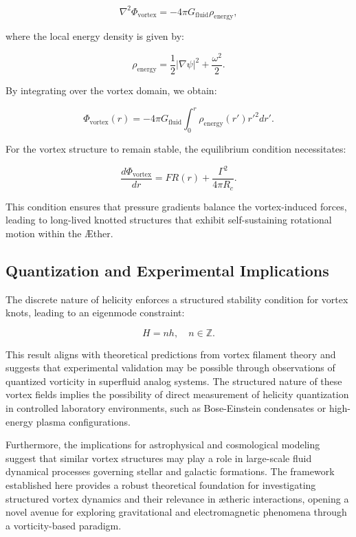 \begin{equation*}
\nabla^2 \Phi_{\text{vortex}} = -4\pi G_{\text{fluid}} \rho_{\text{energy}},
\end{equation*}

where the local energy density is given by:

\begin{equation*}
\rho_{\text{energy}} = \frac{1}{2} |\nabla \psi|^2 + \frac{\omega^2}{2}.
\end{equation*}

By integrating over the vortex domain, we obtain:

\begin{equation*}
\Phi_{\text{vortex}}(r) = -4\pi G_{\text{fluid}} \int_0^r \rho_{\text{energy}}(r') r'^2 dr'.
\end{equation*}

For the vortex structure to remain stable, the equilibrium condition necessitates:

\begin{equation*}
\frac{d\Phi_{\text{vortex}}}{dr} = F R(r) + \frac{\Gamma^2}{4 \pi R_c}.
\end{equation*}

This condition ensures that pressure gradients balance the vortex-induced forces, leading to long-lived knotted structures that exhibit self-sustaining rotational motion within the Æther.

\subsection{Quantization and Experimental Implications}
The discrete nature of helicity enforces a structured stability condition for vortex knots, leading to an eigenmode constraint:

\begin{equation*}
H = n h, \quad n \in \mathbb{Z}.
\end{equation*}

This result aligns with theoretical predictions from vortex filament theory and suggests that experimental validation may be possible through observations of quantized vorticity in superfluid analog systems. The structured nature of these vortex fields implies the possibility of direct measurement of helicity quantization in controlled laboratory environments, such as Bose-Einstein condensates or high-energy plasma configurations.

Furthermore, the implications for astrophysical and cosmological modeling suggest that similar vortex structures may play a role in large-scale fluid dynamical processes governing stellar and galactic formations. The framework established here provides a robust theoretical foundation for investigating structured vortex dynamics and their relevance in ætheric interactions, opening a novel avenue for exploring gravitational and electromagnetic phenomena through a vorticity-based paradigm.